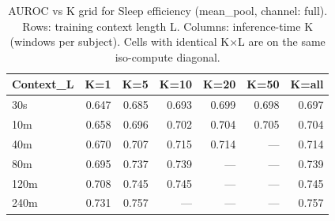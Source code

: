 \begin{table}[ht]
\centering
\caption{AUROC vs K grid for Sleep efficiency (mean_pool, channel: full). Rows: training context length L. Columns: inference-time K (windows per subject). Cells with identical K×L are on the same iso-compute diagonal.}
\label{tab:kgrid_sleep_efficiency_binary_mean_pool_full}
\begin{tabular}{lrrrrrr}
\toprule
Context_L & K=1 & K=5 & K=10 & K=20 & K=50 & K=all \\
\midrule
30s & 0.647 & 0.685 & 0.693 & 0.699 & 0.698 & 0.697 \\
10m & 0.658 & 0.696 & 0.702 & 0.704 & 0.705 & 0.704 \\
40m & 0.670 & 0.707 & 0.715 & 0.714 & — & 0.714 \\
80m & 0.695 & 0.737 & 0.739 & — & — & 0.739 \\
120m & 0.708 & 0.745 & 0.745 & — & — & 0.745 \\
240m & 0.731 & 0.757 & — & — & — & 0.757 \\
\bottomrule
\end{tabular}
\end{table}